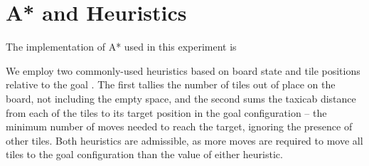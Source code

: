 
\section{A* and Heuristics}
\label{sec:background}

The implementation of A* used in this experiment is 

We employ two commonly-used heuristics based on board state and tile positions relative to the goal \cite{aima}.  The first tallies the number of tiles out of place on the board, not including the empty space, and the second sums the taxicab distance from each of the tiles to its target position in the goal configuration -- the minimum number of moves needed to reach the target, ignoring the presence of other tiles.  Both heuristics are admissible, as more moves are required to move all tiles to the goal configuration than the value of either heuristic.  